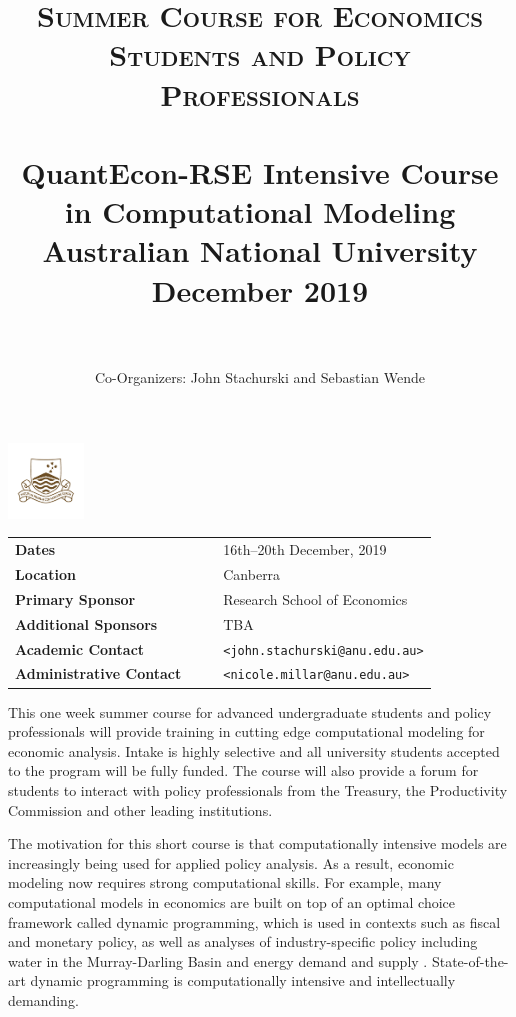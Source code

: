 \documentclass[12pt]{article}
\title{
		\usefont{OT1}{bch}{b}{n}
		\normalfont \normalsize \textsc{Summer Course for Economics Students and Policy Professionals} \\ [25pt]
		\horrule{1pt} \\[0.4cm]
		\huge QuantEcon-RSE Intensive Course in Computational Modeling \\
        \vspace{1em}
		\large Australian National University\\
		\large December 2019\\
		\horrule{1pt} \\[0.5cm]
}
\author{
		\normalfont \normalsize
        Co-Organizers: John Stachurski and Sebastian Wende \\[-3pt]		\normalsize
}
\date{}
\numberwithin{equation}{section}		%
\numberwithin{table}{section}				%
\begin{document}
\maketitle




\begin{center}
    \vspace{-2em}
    \includegraphics[width=2cm]{anu-logo-2.png}
    \vspace{1em}

    \begin{tabular}{ l  r r l}
        \textbf{Dates} & & &  16th--20th December, 2019\\
        \textbf{Location} & & &  Canberra \\
        \textbf{Primary Sponsor} & & &  Research School of Economics \\
        \textbf{Additional Sponsors} & & &  TBA \\
        \textbf{Academic Contact} & & & \texttt{<john.stachurski@anu.edu.au>} \\
        \textbf{Administrative Contact} & & & \texttt{<nicole.millar@anu.edu.au>} \\
    \end{tabular}
\end{center}

\bigskip
\bigskip

\noindent 
This one week summer course for advanced undergraduate students and policy
professionals will provide training in cutting edge computational modeling for
economic analysis.  Intake is highly selective and all university students
accepted to the program will be fully funded.  The course will also provide a
forum for students to interact with policy professionals from the Treasury,
the Productivity Commission and other leading
institutions.

The motivation for this short course is that computationally
intensive models are increasingly being used for applied policy analysis.
As a result, economic modeling now requires strong computational skills.  For example, many
computational models in economics are built on top of an optimal choice
framework called dynamic programming, which is used in contexts such as fiscal
and monetary policy, as well as analyses of industry-specific policy including
water in the Murray-Darling Basin \citep{Grafton2011} and energy demand and supply \citep{Ringkjob2018}.  State-of-the-art dynamic programming is computationally intensive and
     intellectually demanding.
\end{document}

